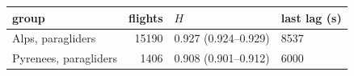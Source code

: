 \begin{tabular}{lrll}
\toprule
group & flights & $H$ & last lag (s) \\
\midrule
Alps, paragliders & 15190 & 0.927 (0.924--0.929) & 8537 \\
Pyrenees, paragliders & 1406 & 0.908 (0.901--0.912) & 6000 \\
\bottomrule
\end{tabular}
